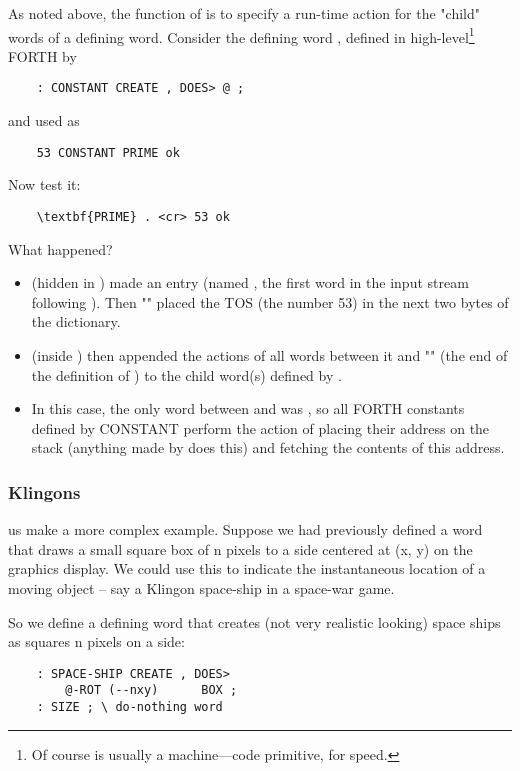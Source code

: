 As noted above, the function of  is to specify a run-time action for the "child" words of a defining word. Consider the defining word , defined in high-level\footnote{Of course  is usually a machine—code primitive, for speed.} FORTH by

\begin{lstlisting}
    : CONSTANT CREATE , DOES> @ ;
\end{lstlisting}
and used as
\begin{lstlisting}
    53 CONSTANT PRIME ok
\end{lstlisting}

Now test it:
\begin{lstlisting}
    \textbf{PRIME} . <cr> 53 ok
\end{lstlisting}

What happened?
\begin{itemize}
    \item {} (hidden in ) made an entry (named  , the first word in the input stream following ). Then "\bc{,}" placed the TOS (the number 53) in the next two bytes of the dictionary.
    \item {} (inside ) then appended the actions of all words between it and "\bc{;}" (the end of the definition of ) to the child word(s) defined by .
    \item In this case, the only word between  and \bc{;} was  , so all FORTH constants defined by CONSTANT perform the action of placing their address on the stack (anything made by  does this) and fetching the contents of this address.
\end{itemize}

\subsubsection{Klingons}

 us make a more complex example. Suppose we had previously defined a word  that draws a small square box of n pixels to a side centered at (x, y) on the graphics display. We could use this to indicate the instantaneous location of a moving object -- say a Klingon space-ship in a space-war game.

So we define a defining word that creates (not very realistic looking) space ships as squares n pixels on a side:

\begin{lstlisting}
    : SPACE-SHIP CREATE , DOES>
        @-ROT (--nxy)      BOX ;
    : SIZE ; \ do-nothing word
\end{lstlisting}

